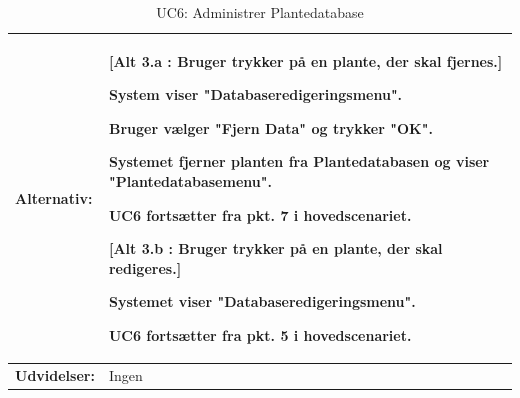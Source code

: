 \begin{table}[h]
\begin{tabularx}{\textwidth}{| >{\raggedright\arraybackslash}p{3.3 cm} | >{\raggedright\arraybackslash}X |}
\textbf{Alternativ:}				& 
\textbf{{[}Alt 3.a : Bruger trykker på en plante, der skal fjernes.{]}}
\begin{packed_enum}
\setcounter{enumi}{3}
\item System viser "Databaseredigeringsmenu".
\item Bruger vælger "Fjern Data" og trykker "OK".
\item Systemet fjerner planten fra Plantedatabasen og viser "Plantedatabasemenu".
\item UC6 fortsætter fra pkt. 7 i hovedscenariet. 
\end{packed_enum}
\textbf{{[}Alt 3.b : Bruger trykker på en plante, der skal redigeres.{]}}
\begin{packed_enum}
\setcounter{enumi}{3}
\item Systemet viser "Databaseredigeringsmenu".
\item UC6 fortsætter fra pkt. 5 i hovedscenariet.
\end{packed_enum}
\\ \hline

\textbf{Udvidelser:}				&  
Ingen
\\ \hline
\end{tabularx}
\caption{UC6: Administrer Plantedatabase}
\label{tbl:UC6}
\end{table}

\clearpage


